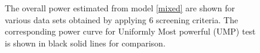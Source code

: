\documentclass{article}
\begin{document}
\begin{figure}[hbtp]
   \centering
       \caption{The overall power estimated from model \ref{mixed} are shown for various data sets obtained by applying 6 screening criteria.  The corresponding power curve for Uniformly Most powerful (UMP) test is shown in black solid lines for comparison.}
       \label{fig:power_screening}
\end{figure}




\end{document}
